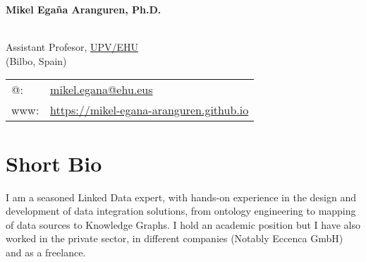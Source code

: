 \documentclass[11pt,fullpage]{article}
\newcommand{\etc}{\emph{etc.}}
\def\name{Mikel Ega\~na Aranguren, Ph.D.}
\begin{document}


\centerline{\Large \bf \name}

\vspace{0.25in}

\begin{minipage}{0.50\linewidth}
~\\
    Assistant Profesor, \href{https://www.ehu.eus/}{UPV/EHU} \\
     (Bilbo, Spain) \\




\end{minipage}
\begin{minipage}{0.50\linewidth}
  \begin{tabular}{ll}
    @: 
& \href{mailto:mikel.egana@ehu.eus}{mikel.egana@ehu.eus} \\
    www: & \href{https://mikel-egana-aranguren.github.io}{https://mikel-egana-aranguren.github.io}

  \end{tabular}
\end{minipage}

\section*{Short Bio}

I am a seasoned Linked Data expert, with hands-on experience in the design and development of data integration solutions, from ontology engineering to mapping of data sources to Knowledge Graphs. I hold an academic position but I have also worked in the private sector, in different companies (Notably Eccenca GmbH) and as a freelance.
\end{document}
